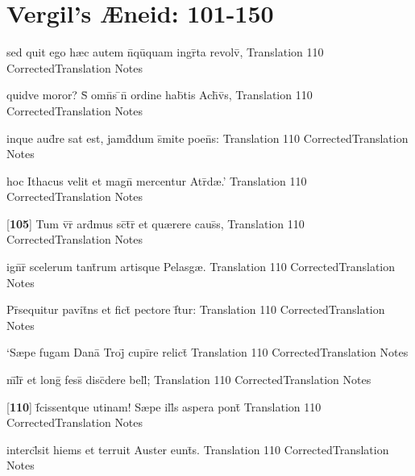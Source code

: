 \section{Vergil's {\AE}neid: 101-150} %

\latline
  {sed quit ego h{\ae}c autem n\={}qu\={\macron {\i}}quam ingr\={}ta revolv\={},}
  { Translation }
  {110}
  { CorrectedTranslation }
  { Notes }


\latline
  {quidve moror?  S\={\macron {\i}} omn\={\macron {\i}}s \={}n\={} ordine hab\={}tis Ach\={\macron {\i}}v\={}s,}
  { Translation }
  {110}
  { CorrectedTranslation }
  { Notes }


\latline
  {inque aud\={\macron {\i}}re sat est, jamd\={}dum s\={}mite poen\={}s:}
  { Translation }
  {110}
  { CorrectedTranslation }
  { Notes }


\latline
  {hoc Ithacus velit et magn\={} mercentur Atr\={\macron {\i}}d{\ae}.'}
  { Translation }
  {110}
  { CorrectedTranslation }
  { Notes }


\latline
  {[\textbf{105}] Tum v\={}r\={} ard\={}mus sc\={\macron {\i}}t\={}r\={\macron {\i}} et qu{\ae}rere caus\={}s,}
  { Translation }
  {110}
  { CorrectedTranslation }
  { Notes }


\latline
  {ign\={}r\={\macron {\i}} scelerum tant\={}rum artisque Pelasg{\ae}.}
  { Translation }
  {110}
  { CorrectedTranslation }
  { Notes }


\latline
  {Pr\={}sequitur pavit\={}ns et fict\={} pectore f\={}tur:}
  { Translation }
  {110}
  { CorrectedTranslation }
  { Notes }


\latline
  {`S{\ae}pe fugam Dana\={\macron {\i}} Troj\={} cupi\={}re relict\={}}
  { Translation }
  {110}
  { CorrectedTranslation }
  { Notes }


\latline
  {m\={}l\={\macron {\i}}r\={\macron {\i}} et long\={} fess\={\macron {\i}} disc\={}dere bell\={};}
  { Translation }
  {110}
  { CorrectedTranslation }
  { Notes }


\latline
  {[\textbf{110}] f\={}cissentque utinam!  S{\ae}pe ill\={}s aspera pont\={\macron {\i}}}
  { Translation }
  {110}
  { CorrectedTranslation }
  { Notes }


\latline
  {intercl\={}sit hiems et terruit Auster eunt\={\macron {\i}}s.}
  { Translation }
  {110}
  { CorrectedTranslation }
  { Notes }


